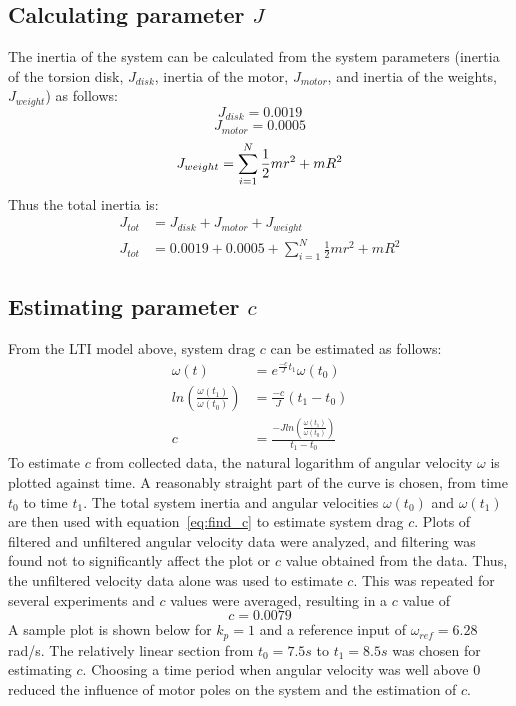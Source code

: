 \documentclass[11pt,titlepage]{article}
\begin{document}
	\subsection{Calculating parameter $J$}
	The inertia of the system can be calculated from the system parameters (inertia of the torsion disk, $J_{disk}$, inertia of the motor, $J_{motor}$, and inertia of the weights, $J_{weight}$) as follows:
		$$J_{disk}=0.0019$$
		$$J_{motor}=0.0005$$
	\begin{equation}
		J_{weight}=\sum\limits_{i=1}^{N} \frac{1}{2}mr^2 + mR^2\\
	\end{equation}
	Thus the total inertia is:
	\begin{align}
		J_{tot}&=J_{disk}+J_{motor}+J_{weight}\nonumber\\
		J_{tot}&=0.0019+0.0005+\sum\limits_{i=1}^{N} \frac{1}{2}mr^2 + mR^2
	\end{align}

	\subsection{Estimating parameter $c$}
	From the LTI model above, system drag $c$ can be estimated as follows:
	\begin{align}
		\omega(t)&=e^{\frac{-c}{J}t_1}\omega(t_0)\nonumber\\
		ln\left( \frac{\omega(t_1)}{\omega(t_0)}\right)&=\frac{-c}{J}(t_1-t_0)\nonumber\\
		c&=\frac{-Jln\left(\frac{\omega(t_1)}{\omega(t_0)}\right)}{t_1-t_0}\label{eq:find_c}
	\end{align}
	To estimate $c$ from collected data, the natural logarithm of angular velocity $\omega$ is plotted against time. A reasonably straight part of the curve is chosen, from time $t_0$ to time $t_1$. The total system inertia and angular velocities $\omega(t_0)$ and $\omega(t_1)$ are then used with equation~\ref{eq:find_c} to estimate system drag $c$. Plots of filtered and unfiltered angular velocity data were analyzed, and filtering was found not to significantly affect the plot or $c$ value obtained from the data. Thus, the unfiltered velocity data alone was used to estimate $c$. This was repeated for several experiments and $c$ values were averaged, resulting in a $c$ value of 
	\begin{equation}
		c=0.0079\nonumber
	\end{equation}
	A sample plot is shown below for $k_p=1$ and a reference input of $\omega_{ref}=6.28$ rad/s. The relatively linear section from $t_0=7.5s$ to $t_1=8.5s$ was chosen for estimating $c$. Choosing a time period when angular velocity was well above 0 reduced the influence of motor poles on the system and the estimation of $c$.
	
\end{document}
